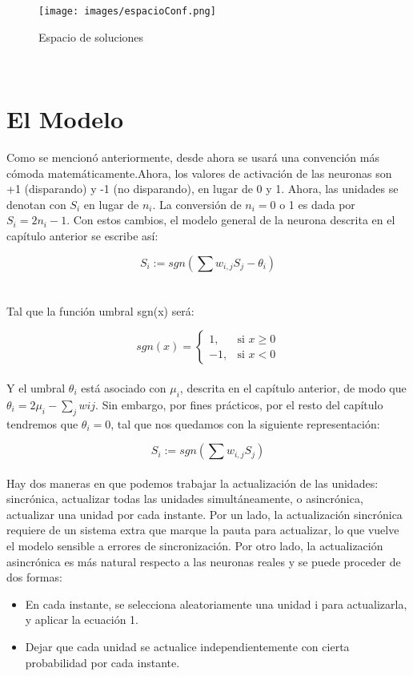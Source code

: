 \documentclass{article}
\begin{document}
\begin{figure}[h]
\centering
\texttt{[image: images/espacioConf.png]}
\caption{Espacio de soluciones}
\label{fig:Espacio de soluciones}
\end{figure}
\\


\section{El Modelo}

Como se mencionó anteriormente, desde ahora se usará una convención más cómoda matemáticamente.Ahora, los valores de activación de las neuronas son +1 (disparando) y -1 (no disparando), en lugar de 0 y 1. Ahora, las unidades se denotan con $S_i$ en lugar de $n_i$. La conversión de $n_i = 0 $ o 1 es dada por $S_i = 2n_i - 1$. Con estos cambios, el modelo general de la neurona descrita en el capítulo anterior se escribe así:

\begin{equation}
    S_i := sgn(\sum w_{i,j}S_j - \theta_i)
    \label{eq:Modelo}
\end{equation}
\\\\
Tal que la función umbral sgn(x) será:

\begin{equation}
    sgn(x) =
    \begin{cases}
        1, & \text{si } x \geq 0 \\
        -1, & \text{si } x < 0
    \end{cases}
    \label{eq:umbral sgn}
\end{equation}
\\
Y el umbral $\theta_i$ está asociado con $\mu_i$, descrita en el capítulo anterior, de modo que $\theta_i = 2\mu_i - \sum_j w{ij}$. Sin embargo, por fines prácticos, por el resto del capítulo tendremos que $\theta_i = 0$, tal que nos quedamos con la siguiente representación:

\begin{equation}
    S_i := sgn(\sum w_{i,j}S_j)
    \label{eq:Modelo}
\end{equation}
\\

Hay dos maneras en que podemos trabajar la actualización de las unidades: sincrónica, actualizar todas las unidades simultáneamente, o asincrónica, actualizar una unidad por cada instante. Por un lado, la actualización sincrónica requiere de un sistema extra que marque la pauta para actualizar, lo que vuelve el modelo sensible a errores de sincronización. Por otro lado, la actualización asincrónica es más natural respecto a las neuronas reales y se puede proceder de dos formas:
\begin{itemize}
    \item En cada instante, se selecciona aleatoriamente una unidad i para actualizarla, y aplicar la ecuación 1.
    \item Dejar que cada unidad se actualice independientemente con cierta probabilidad por cada instante.
\end{itemize}
\\
\end{document}
